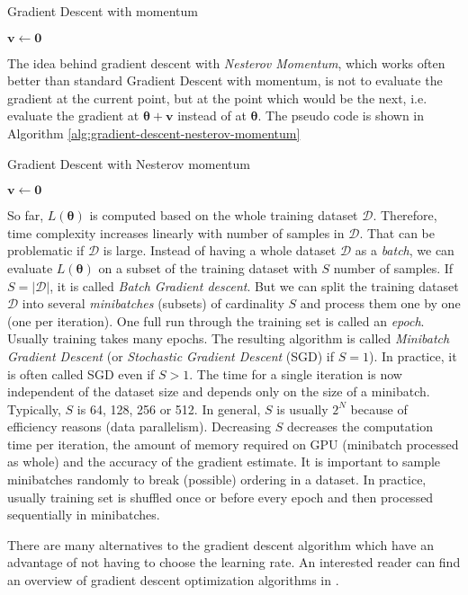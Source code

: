 \begin{algorithm}[htb]
\caption{Gradient Descent with momentum}
\label{alg:gradient-descent-momentum}


$\pmb v \leftarrow \pmb 0$\;
\end{algorithm}

The idea behind gradient descent with \textit{Nesterov Momentum}, which works often better than standard Gradient Descent with momentum, is not to evaluate the gradient at the current point, but at the point which would be the next, i.e. evaluate the gradient at $\pmb \theta + \pmb v$ instead of at $\pmb \theta$. The pseudo code is shown in Algorithm \ref{alg:gradient-descent-nesterov-momentum}

\begin{algorithm}[htb]
\caption{Gradient Descent with Nesterov momentum}
\label{alg:gradient-descent-nesterov-momentum}


$\pmb v \leftarrow \pmb 0$ \;
\end{algorithm}

So far, $L(\pmb \theta)$ is computed based on the whole training dataset $\mathcal{D}$. Therefore, time complexity increases linearly with number of samples in $\mathcal{D}$. That can be problematic if $\mathcal{D}$ is large. Instead of having a whole dataset $\mathcal{D}$ as a \textit{batch}, we can evaluate $L(\pmb \theta)$ on a subset of the training dataset with $S$ number of samples. If $S = |\mathcal{D}|$, it is called \textit{Batch Gradient descent}. But we can split the training dataset $\mathcal{D}$ into several \textit{minibatches} (subsets) of cardinality $S$ and process them one by one (one per iteration). One full run through the training set is called an \textit{epoch}. Usually training takes many epochs. The resulting algorithm is called \textit{Minibatch Gradient Descent} (or \textit{Stochastic Gradient Descent} (SGD) if $S = 1$). In practice, it is often called SGD even if $S > 1$. The time for a single iteration is now independent of the dataset size and depends only on the size of a minibatch. Typically, $S$ is 64, 128, 256 or 512. In general, $S$ is usually $2^{N}$ because of efficiency reasons (data parallelism). Decreasing $S$ decreases the computation time per iteration, the amount of memory required on GPU (minibatch processed as whole) and the accuracy of the gradient estimate. It is important to sample minibatches randomly to break (possible) ordering in a dataset. In practice, usually training set is shuffled once or before every epoch and then processed sequentially in minibatches. 


There are many alternatives to the gradient descent algorithm which have an advantage of not having to choose the learning rate. An interested reader can find an overview of gradient descent optimization algorithms in \cite{gradient-descent-overview}. 



